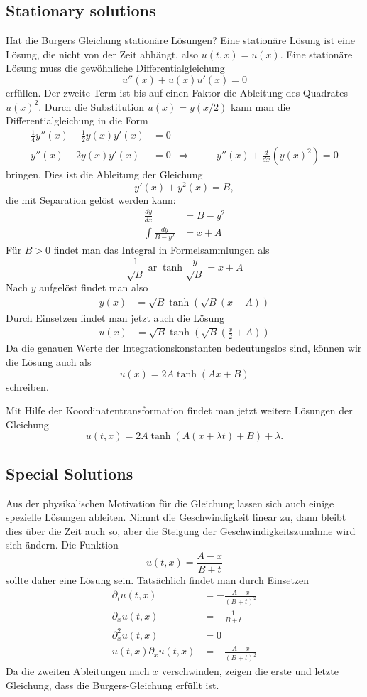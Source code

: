 \subsection{Stationary solutions}
Hat die Burgers Gleichung stationäre Lösungen? Eine stationäre Lösung ist
eine Lösung, die nicht von der Zeit abhängt, also
$u(t,x)=u(x)$.
Eine stationäre Lösung muss die gewöhnliche
Differentialgleichung
\[
u''(x)+u(x)u'(x)=0
\]
erfüllen. Der zweite Term ist bis auf einen Faktor die Ableitung
des Quadrates $u(x)^2$. Durch die Substitution $u(x)=y(x/2)$ kann man
die Differentialgleichung in die Form
\begin{align*}
\frac14y''(x)+\frac12y(x)y'(x)&=0
\\
y''(x)+2y(x)y'(x)&=0&\Rightarrow&\qquad y''(x)+\frac{d}{dx}(y(x)^2)=0
\end{align*}
bringen.
Dies ist die Ableitung der Gleichung
\[
y'(x)+y^2(x)=B,
\]
die mit Separation gelöst werden kann:
\begin{align*}
\frac{dy}{dx}&=B-y^2\\
\int\frac{dy}{B-y^2}&=x+A
\end{align*}
Für $B>0$  findet man das Integral in Formelsammlungen als
\[
\frac1{\sqrt{B}}\operatorname{ar}\tanh \frac{y}{\sqrt{B}}=x+A
\]
Nach $y$ aufgelöst findet man also
\begin{align*}
y(x)&=\sqrt{B}\tanh(\sqrt{B}(x+A))
\end{align*}
Durch Einsetzen findet man jetzt auch die Lösung
\begin{align*}
u(x)&=
\sqrt{B}\tanh\left(\sqrt{B}\left(\frac{x}2+A\right)\right)
\end{align*}
Da die genauen Werte der Integrationskonstanten bedeutungslos sind, können
wir die Lösung auch als
\[
u(x)= 2A \tanh (Ax+B) 
\]
schreiben.

Mit Hilfe der Koordinatentransformation findet man jetzt weitere Lösungen
der Gleichung
\[
u(t,x)=
2A \tanh (A(x+\lambda t)+B) +\lambda.
\]

\subsection{Special Solutions}
Aus der physikalischen Motivation für die Gleichung lassen sich auch
einige spezielle Lösungen ableiten.
Nimmt die Geschwindigkeit linear zu, dann bleibt dies über die Zeit auch
so, aber die Steigung der Geschwindigkeitszunahme wird sich ändern.
Die Funktion
\[
u(t,x)=\frac{A-x}{B+t}
\]
sollte daher
eine Lösung sein. Tatsächlich findet man durch Einsetzen
\begin{align*}
\partial_t u(t,x)&=-\frac{A-x}{(B+t)^2}
\\
\partial_x u(t,x)&=-\frac{1}{B+t}
\\
\partial_x^2 u(t,x)&=0
\\
u(t,x)
\partial_xu(t,x)&=-\frac{A-x}{(B+t)^2}
\end{align*}
Da die zweiten Ableitungen nach $x$ verschwinden,
zeigen die erste und letzte Gleichung, dass die Burgers-Gleichung
erfüllt ist.

